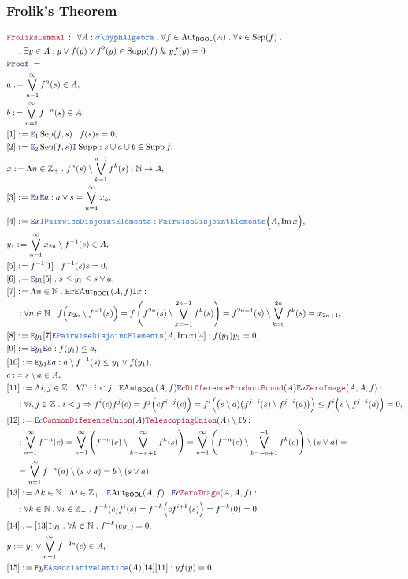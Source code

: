 \documentclass[12pt]{scrartcl}
\newcommand{\TYPE}[1]{\textcolor{NavyBlue}{\mathtt{#1}}}
\newcommand{\LOGIC}[1]{\textcolor{Blue}{\mathtt{#1}}}
\newcommand{\THM}[1]{\textcolor{Maroon}{\mathtt{#1}}}
\renewcommand{\.}{\; . \;}
\newcommand{\de}{: \kern 0.1pc =}
\newcommand{\Theorem}[2]{& \THM{#1} \, :: \, #2 \\ & \Proof = \\ }
\newcommand{\NewLine}{\\ & \kern 1pc}
\newcommand{\Page}[1]{ \begin{align*} #1 \end{align*}   }
\renewcommand{\And}{\; \& \;}
\newcommand{\Imply}{\Rightarrow}
\newcommand{\Intro}{\LOGIC{I}}
\newcommand{\Elim}{\LOGIC{E}}
\newcommand{\Int}{\mathbb{Z} }
\newcommand{\Nat}{\mathbb{N} }
\DeclareMathOperator*{\im}{Im}
\newcommand{\Aut}{\mathrm{Aut}}
\newcommand{\Say}[3]{& #1 \de #2 : #3, \\}
\newcommand{\SayIn}[3]{& #1 \de #2 \in #3, \\}
\newcommand{\Proof}{\LOGIC{Proof} \; }
\newcommand{\SA}{\TYPE{\sigma \hyph Algebra}}
\newcommand{\PD}{\TYPE{PairwiseDisjointElements}}
\DeclareMathOperator{\Supp}{Supp}
\DeclareMathOperator{\Sep}{Sep}
\newcommand{\BOOL}{\mathsf{BOOL}}
\begin{document}
\subsubsection{Frolik's Theorem}
\Page{
	\Theorem{FroliksLemma1}
	{
		\forall A : \SA \.
		\forall f \in \Aut_\BOOL(A) \.
		\forall s \in \Sep(f) \.
		\NewLine \.
		\exists y \in A :
		y \vee f(y) \vee f^2(y) \in \Supp(f)
		\And
		yf(y) = 0
	}
	\SayIn{a}{\bigvee_{n=1}^\infty f^n(s)}{A}
	\SayIn{b}{\bigvee_{n=1}^\infty f^{-n}(s)}{A}
	\Say{[1]}{\Elim_1 \Sep(f,s) }{f(s)s = 0}
	\Say{[2]}{\Elim_2 \Sep(f,s) \Intro \Supp }{ s \cup a \cup b \in \Supp f}
	\Say{x}{\Lambda n \in \Int_+ \. f^n(s) \setminus \bigvee^{n-1}_{k=1} f^k(s)}
	{ \Nat \to A}
	\Say{[3]}{\Elim x \Elim a}{a \vee s = \bigvee_{n=1}^\infty x_n} 
	\Say{[4]}{\Elim x \Intro \PD}{\PD\Big( A ,\im x \Big)}
	\SayIn{y_1}{ \bigvee_{n=1}^\infty x_{2n} \setminus f^{-1}(s)}{A}
	\Say{[5]}{f^{-1}[1]}{f^{-1}(s)s=0} 
	\Say{[6]}{\Elim y_1 [5]}{ s \le y_1 \le s \vee a }
	\Say{[7]}{
		\Lambda n \in \Nat \.	
		\Elim x
		\Elim \Aut_\BOOL(A,f)
		\Intro x
	}
	{
		\NewLine :		
		\forall n \in \Nat \.
		f\Big( x_{2n} \setminus f^{-1}(s) \Big) =
		f\left(  f^{2n}(s) \setminus \bigvee^{2n-1}_{k=-1} f^k(s) \right) = 
		f^{2n+1}(s) \setminus \bigvee^{2n}_{k=0} f^k(s) = x_{2n + 1}
	}
	\Say{[8]}{\Elim y_1 [7] \Elim \PD(A,\im x)[4]}
	{
		f(y_1)y_1 = 0
	}
	\Say{[9]}{\Elim y_1 \Elim a}{f(y_1) \le a}
	\Say{[10]}{\Elim y_1 \Elim a}{a \setminus f^{-1}(s) \le y_1 \vee f(y_1) }
	\SayIn{c}{s \setminus a}{A}
	\Say{[11]}{
		\Lambda i,j \in \Int \.
		\Lambda T : i < j \.	
		\Elim  \Aut_\BOOL(A,f) 
		\Elim c
		\THM{DifferenceProductBound}(A)
		\Elim a
		\THM{ZeroImage}(A,A,f) 		 	 	
	}
	{
		\NewLine :		
		\forall i,j \in \Int \.   i < j \Imply	
		f^i(c) f^j(c) = 
		f^j\Big(  c f^{i-j}(c) \Big) = 
		f^i\Big( \big( s \setminus a) \big( f^{j-i}(s) \setminus f^{j-i}(a)\big)\Big) \le
		f^i\Big( s \setminus f^{j-i}(a) \Big) = 0
	}
	\Say{[12]}{ \Elim c 
		\THM{CommonDiferenceUnion}(A)
		\THM{TelescopingUnion}(A) 
		\setminus \Intro b
	}
	{
		\NewLine :	
		\bigvee_{n=1}^\infty f^{-n}(c) = 
		\bigvee_{n=1}^\infty 
		\left( f^{-n}(s) \setminus \bigvee_{k={-n+1}}^\infty f^k(s) \right)
		=
		\bigvee_{n=1}^\infty 
		\left( f^{-n}(c) \setminus \bigvee_{k={-n+1}}^{-1} f^k(c) \right)
		\setminus (s \vee a)=  \NewLine =
		\bigvee_{n=1}^\infty  f^{-n}(a) \setminus (s \vee a) = 
		b \setminus (s \vee a)
 	}
 	\Say{[13]}{
 		\Lambda k \in \Nat \.
 		\Lambda i \in \Int_+ \.
 		\Elim \Aut_\BOOL(A,f) \.
 		\Elim c 
 		\THM{ZeroImage}(A,A,f) 		
 	}
 	{
		\NewLine : 		
 		\forall k \in \Nat \. 
 		\forall i \in \Int_+ \.
 		f^{-k}(c) f^i(s) = 
 		f^{-k}\Big( c f^{i + k}(s) \Big) = 
 		f^{-k}(0) =
 		0 
 	}
 	\Say{[14]}{[13]\Intro y_1}{\forall k \in \Nat \. f^{-k}(cy_1) = 0}
	\SayIn{y}{y_1 \vee \bigvee^\infty_{n=1} f^{-2n}(c)}{A} 	
 	\Say{[15]}{\Elim y \Elim \TYPE{AssociativeLattice}(A) [14][11]}{  yf(y)  = 0}
}
\end{document}

